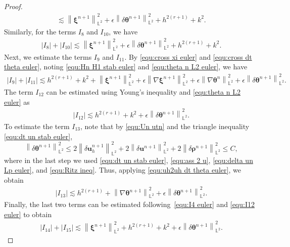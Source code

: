 \documentclass[11pt, reqno]{amsart}
\theoremstyle{definition}
\theoremstyle{remark}
\numberwithin{equation}{section}
\newcommand{\bff}{\boldsymbol}
\newcommand{\bb}{\mathbb}
\newcommand{\norm}[2]{\left\|{#1}\right\|_{#2}}
\newcommand{\abs}[1]{\left|{#1}\right|}
\begin{document}
\begin{proof}
\begin{align*}
		\lesssim
		\norm{\bff{\xi}^{n+1}}{\bb{L}^2}^2
		+
		\epsilon \norm{\delta \bff{\theta}^{n+1}}{\bb{L}^2}^2
		+
		h^{2(r+1)} + k^2.
	\end{align*}
	Similarly, for the terms $I_8$ and $I_{10}$, we have
	\begin{align*}
		\abs{I_8}+\abs{I_{10}}
		\lesssim
		\norm{\bff{\xi}^{n+1}}{\bb{L}^2}^2
		+
		\epsilon \norm{\delta \bff{\theta}^{n+1}}{\bb{L}^2}^2
		+
		h^{2(r+1)} + k^2.
	\end{align*}
	Next, we estimate the terms $I_9$ and $I_{11}$. 
	By \eqref{equ:cross xi euler} and \eqref{equ:cross dt theta euler}, noting \eqref{equ:Hn H1 stab euler} and \eqref{equ:theta n L2 euler}, we have
	\begin{align*}
		\abs{I_9}+\abs{I_{11}}
		\lesssim
		h^{2(r+1)} 
		+ 
		k^2
		+
		\norm{\bff{\xi}^{n+1}}{\bb{L}^2}^2 
		+ 
		\epsilon \norm{\nabla \bff{\xi}^{n+1}}{\bb{L}^2}^2
		+
		\epsilon \norm{\nabla \bff{\theta}^n}{\bb{L}^2}^2
		+
		\epsilon \norm{\delta \bff{\theta}^{n+1}}{\bb{L}^2}^2.
	\end{align*}
	The term $I_{12}$ can be estimated using Young's inequality and \eqref{equ:theta n L2 euler} as
	\begin{align}\label{equ:I12 euler}
		\abs{I_{12}}
		\lesssim
		h^{2(r+1)}+k^2 + \epsilon \norm{\delta \bff{\theta}^{n+1}}{\bb{L}^2}^2.
	\end{align}
	To estimate the term $I_{13}$, note that by \eqref{equ:Un utn} and the triangle inequality \eqref{equ:dt un stab euler},
	\[
		\norm{\delta \bff{\theta}^{n+1}}{\bb{L}^2}^2
		\leq
		2\norm{\delta \bff{u}_h^{n+1}}{\bb{L}^2}^2
		+
		2\norm{\delta \bff{u}^{n+1}}{\bb{L}^2}^2
		+
		2\norm{\delta \bff{\rho}^{n+1}}{\bb{L}^2}^2 \leq C,
	\]
	where in the last step we used \eqref{equ:dt un stab euler}, \eqref{equ:ass 2 u}, \eqref{equ:delta un Lp euler}, and \eqref{equ:Ritz ineq}. Thus, applying \eqref{equ:uh2uh dt theta euler}, we obtain
	\begin{align*}
		\abs{I_{13}}
		\lesssim
		h^{2(r+1)}
		+
		\norm{\nabla \bff{\theta}^{n+1}}{\bb{L}^2}^2  
		+ 
		\epsilon \norm{\delta \bff{\theta}^{n+1}}{\bb{L}^2}^2.
	\end{align*}
	Finally, the last two terms can be estimated following~\eqref{equ:I4 euler} and \eqref{equ:I12 euler} to obtain
	\begin{align}\label{equ:I14 euler}
		|I_{14}|+|I_{15}|
		\lesssim
		\norm{\bff{\xi}^{n+1}}{\bb{L}^2}^2
		+ h^{2(r+1)} + k^2
		+
		\epsilon \norm{\delta \bff{\theta}^{n+1}}{\bb{L}^2}^2.
	\end{align}

\end{proof}
\end{document}
